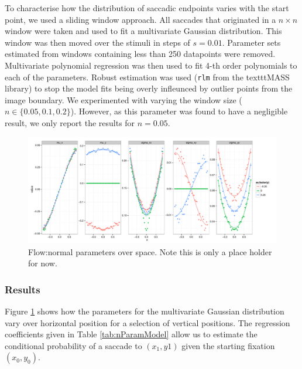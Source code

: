 \documentclass[a4paper, onecolumn, oneside, 11pt]{article}
\begin{document}
To characterise how the distribution of saccadic endpoints varies with the start point, we used a sliding window approach. All saccades that originated in a $n\times n$ window were taken and used to fit a multivariate Gaussian distribution. This window was then moved over the stimuli in steps of $s=0.01$. Parameter sets estimated from windows containing less than 250 datapoints were removed. Multivariate polynomial regression was then used to fit 4-th order polynomials to each of the parameters. Robust estimation was used (\texttt{rlm} from the texttt{MASS} library) to stop the model fits being overly infleunced by outlier points from the image boundary. We experimented with varying the window size ($n\in\{0.05,0.1, 0.2\}$). However, as this parameter was found to have a negligible result, we only report the results for $n=0.05$.

\begin{figure}
\centering
 \includegraphics[width=13cm]{../scripts/flow/figs/NparamsChagingOverSpace_ALL_N.pdf}
\caption{Flow:normal parameters over space. Note this is only a place holder for now. }
\label{fig:nParamsOverSpace}
\end{figure}

\subsubsection{Results}

Figure \ref{fig:nParamsOverSpace} shows how the parameters for the multivariate Gaussian distribution vary over horizontal position for a selection of vertical positions. The regression coefficients given in Table \ref{tab:nParamModel} allow us to estimate the conditional probability of a saccade to $(x_1, y1)$ given the starting fixation $(x_0, y_0)$.
\end{document}
